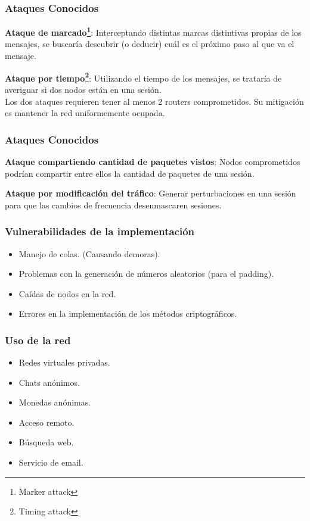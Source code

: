 \documentclass{beamer}
\newcommand{\vspc}{\vspace{0.5cm}}
\begin{document}
\begin{frame}
    \frametitle{Ataques Conocidos}
    \textbf{Ataque de marcado\footnote{Marker attack}}: Interceptando distintas marcas distintivas propias de los mensajes, se buscaría descubrir (o deducir) cuál es el próximo paso al que va el mensaje.\\
    
    \vspc

    \textbf{Ataque por tiempo\footnote{Timing attack}}: Utilizando el tiempo de los mensajes, se trataría de averiguar si dos nodos están en una sesión.\\

    Los dos ataques requieren tener al menos 2 routers comprometidos. Su mitigación es mantener la red uniformemente ocupada.

\end{frame}

\begin{frame}
    \frametitle{Ataques Conocidos}
    \textbf{Ataque compartiendo cantidad de paquetes vistos}: Nodos comprometidos podrían compartir entre ellos la cantidad de paquetes de una sesión.\\
    
    \vspc

    \textbf{Ataque por modificación del tráfico}: Generar perturbaciones en una sesión para que las cambios de frecuencia desenmascaren sesiones.\\

\end{frame}

\begin{frame}
    \frametitle{Vulnerabilidades de la implementación}

    \begin{itemize}
        \item Manejo de colas. (Causando demoras).
        \item Problemas con la generación de números aleatorios (para el padding).
        \item Caídas de nodos en la red.
        \item Errores en la implementación de los métodos criptográficos.
    \end{itemize}

\end{frame}

\begin{frame}
    \frametitle{Uso de la red}
    \begin{itemize}
        \item Redes virtuales privadas. 
        \item Chats anónimos.
        \item Monedas anónimas.
        \item Acceso remoto.
        \item Búsqueda web.
        \item Servicio de email.
    \end{itemize}
\end{frame}
\end{document}
